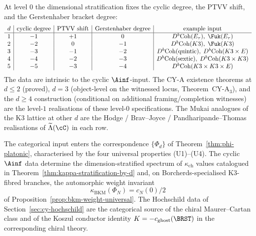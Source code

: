 \begin{remark}
\label{rem:cy-cat-d-stratification-level-0}
At level $0$ the dimensional stratification fixes the cyclic degree,
the PTVV shift, and the Gerstenhaber bracket degree:
\[
\begin{array}{c|c|c|c|c}
 d & \text{cyclic degree} & \text{PTVV shift} &
 \text{Gerstenhaber degree} & \text{example input} \\\hline
 1 & -1 & +1 & 0 & D^b\mathrm{Coh}(E_\tau),\;\Fuk(E_\tau) \\
 2 & -2 & 0 & -1 & D^b\mathrm{Coh}(K3),\;\Fuk(K3) \\
 3 & -3 & -1 & -2 & D^b\mathrm{Coh}(\mathrm{quintic}),\;
 D^b\mathrm{Coh}(K3\times E) \\
 4 & -4 & -2 & -3 & D^b\mathrm{Coh}(\mathrm{sextic}),\;
 D^b\mathrm{Coh}(K3\times K3) \\
 5 & -5 & -3 & -4 & D^b\mathrm{Coh}(K3\times K3\times E)
\end{array}
\]
The data are intrinsic to the cyclic $\Ainf$-input. The CY-A
existence theorems at $d \leq 2$ (proved), $d = 3$
(object-level on the witnessed locus, Theorem~CY-A$_3$), and the
$d \geq 4$ construction (conditional on additional framing/completion
witnesses) are the level-$1$ realisations of these level-$0$
specifications. The Mukai analogues of the K3 lattice at other $d$
are the Hodge / Brav--Joyce / Pandharipande--Thomas realisations of
$\widetilde\Lambda(\cC)$ in each row.
\end{remark}

\begin{remark}
\label{rem:cy-cat-cross-volume-anchors}
The categorical input enters the correspondence $\{\Phi_d\}$ of Theorem~\textup{\ref{thm:phi-platonic}}, characterised by the four universal properties \textup{(U1)}--\textup{(U4)}. The cyclic $\Ainf$ data determine the dimension-stratified spectrum of $\kappa_{\mathrm{ch}}$ values catalogued in Theorem~\textup{\ref{thm:kappa-stratification-by-d}} and, on Borcherds-specialised K3-fibred branches, the automorphic weight invariant
\[
 \kappa_{\mathrm{BKM}}(\Phi_N) = c_N(0)/2
\]
of Proposition~\textup{\ref{prop:bkm-weight-universal}}. The Hochschild data of Section~\textup{\ref{sec:cy-hochschild}} are the categorical source of the chiral Maurer--Cartan class and of the Koszul conductor identity $K = -c_{\mathrm{ghost}}(\BRST)$ in the corresponding chiral theory.
\end{remark}

